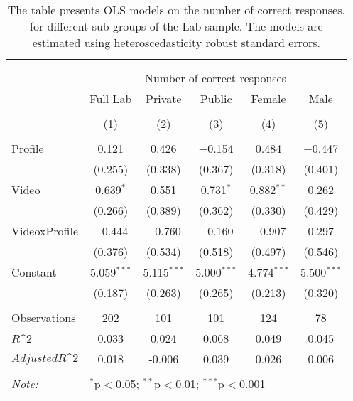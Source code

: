 
\begin{table}[H] \centering 
  \caption{The table presents OLS models on the number of correct responses, for different sub-groups of the Lab sample. The models are estimated
            using heteroscedasticity robust standard errors.} 
  \label{tbl:Main_results_CR_no_control_lab} 
\begin{tabular}{@{\extracolsep{5pt}}lccccc} 
\\[-1.8ex]\hline 
\hline \\[-1.8ex] 
\\[-1.8ex] & \multicolumn{5}{c}{Number of correct responses} \\ 
 & Full Lab & Private & Public & Female & Male \\ 
\\[-1.8ex] & (1) & (2) & (3) & (4) & (5)\\ 
\hline \\[-1.8ex] 
 Profile & 0.121 & 0.426 & $-$0.154 & 0.484 & $-$0.447 \\ 
  & (0.255) & (0.338) & (0.367) & (0.318) & (0.401) \\ 
  Video & 0.639$^{*}$ & 0.551 & 0.731$^{*}$ & 0.882$^{**}$ & 0.262 \\ 
  & (0.266) & (0.389) & (0.362) & (0.330) & (0.429) \\ 
  VideoxProfile & $-$0.444 & $-$0.760 & $-$0.160 & $-$0.907 & 0.297 \\ 
  & (0.376) & (0.534) & (0.518) & (0.497) & (0.546) \\ 
  Constant & 5.059$^{***}$ & 5.115$^{***}$ & 5.000$^{***}$ & 4.774$^{***}$ & 5.500$^{***}$ \\ 
  & (0.187) & (0.263) & (0.265) & (0.213) & (0.320) \\ 
 \hline \\[-1.8ex] 
Observations & 202 & 101 & 101 & 124 & 78 \\ 
$R\^2$ & 0.033 & 0.024 & 0.068 & 0.049 & 0.045 \\ 
$Adjusted R\^2$ & 0.018 & -0.006 & 0.039 & 0.026 & 0.006 \\ 
\hline 
\hline \\[-1.8ex] 
\textit{Note:}  & \multicolumn{5}{l}{$^{*}$p$<$0.05; $^{**}$p$<$0.01; $^{***}$p$<$0.001} \\ 
\end{tabular} 
\end{table} 
